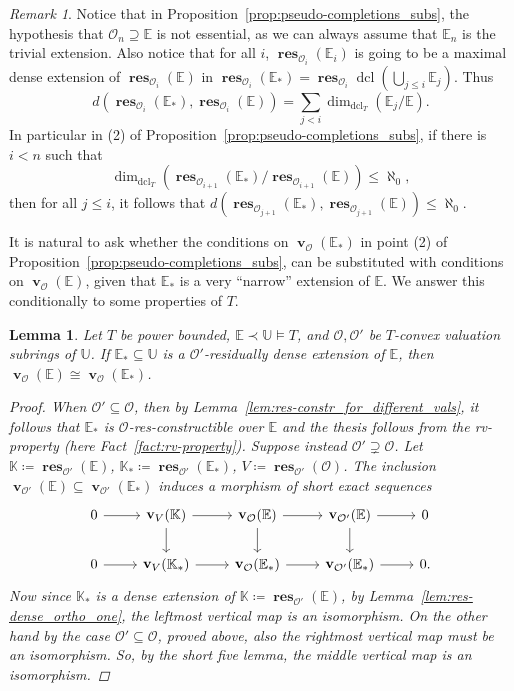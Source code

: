 \documentclass{amsart}
\newtheorem{lemma}[theorem]{Lemma}
\theoremstyle{remark}
\newtheorem{remark}[theorem]{Remark}
\theoremstyle{definition}
\theoremstyle{plain}
\newcommand{\bE}{\mathbb E}
\newcommand{\bK}{\mathbb K}
\newcommand{\bU}{\mathbb U}
\newcommand{\cO}{\mathcal O}
\DeclareMathOperator{\val}{\mathbf{v}}
\DeclareMathOperator{\res}{\mathbf{res}}
\DeclareMathOperator{\dcl}{\mathrm{dcl}}
\theoremstyle{plain}
\begin{document}
\begin{remark}
    Notice that in Proposition~\ref{prop:pseudo-completions_subs}, the hypothesis that $\cO_n\supseteq \bE$ is not essential, as we can always assume that $\bE_n$ is the trivial extension. 
    Also notice that for all $i$, $\res_{\cO_i}(\bE_i)$ is going to be a maximal dense extension of $\res_{\cO_i}(\bE)$ in $\res_{\cO_i}(\bE_*)=\res_{\cO_i}\dcl(\bigcup_{j\le i} \bE_j)$. Thus \[d(\res_{\cO_i}(\bE_*), \res_{\cO_i}(\bE))=\sum_{j<i}\dim_{\dcl_T}(\bE_j/\bE).\]
    In particular in (2) of Proposition~\ref{prop:pseudo-completions_subs}, if there is $i<n$ such that 
    \[\dim_{\dcl_T}(\res_{\cO_{i+1}}(\bE_*)/ \res_{\cO_{i+1}}(\bE))\le \aleph_0,\]
    then for all $j\le i$, it follows that $d(\res_{\cO_{j+1}}(\bE_*), \res_{\cO_{j+1}}(\bE) )\le \aleph_0$.

\end{remark}

It is natural to ask whether the conditions on $\val_{\cO}(\bE_*)$ in point (2) of Proposition~\ref{prop:pseudo-completions_subs}, can be substituted with conditions on $\val_{\cO}(\bE)$, given that $\bE_*$ is a very ``narrow'' extension of $\bE$. We answer this conditionally to some properties of $T$.

\begin{lemma}\label{lem:pbdd_res_dense_ext_vg}
    Let $T$ be power bounded, $\bE\prec \bU \models T$, and $\cO, \cO'$ be $T$-convex valuation subrings of $\bU$. If $\bE_*\subseteq \bU$ is a $\cO'$-residually dense extension of $\bE$, then $\val_\cO(\bE)\cong\val_{\cO}(\bE_*)$.
    \begin{proof}
        When $\cO'\subseteq \cO$, then by Lemma~\ref{lem:res-constr_for_different_vals}, it follows that $\bE_*$ is $\cO$-res-constructible over $\bE$ and the thesis follows from the rv-property (here Fact~\ref{fact:rv-property}).
        Suppose instead $\cO' \supsetneq \cO$.
        Let $\bK \coloneqq  \res_{\cO'}(\bE)$, $\bK_*\coloneqq \res_{\cO'}(\bE_*)$, $V\coloneqq \res_{\cO'}(\cO)$.
        The inclusion $\val_{\cO'}(\bE) \subseteq \val_{\cO'}(\bE_*)$ induces a morphism of short exact sequences
        \[\begin{tikzcd}
            0 \ar[r] &\val_V(\bK)\ar[d] \ar[r] &\val_{\cO}(\bE) \ar[r]\ar[d]& \val_{\cO'}(\bE) \ar[r]\ar[d] &0\\
            0 \ar[r] &\val_V(\bK_*) \ar[r] &\val_{\cO}(\bE_*) \ar[r]& \val_{\cO'}(\bE_*) \ar[r] &0.
        \end{tikzcd}\]
        Now since $\bK_*$ is a dense extension of $\bK\coloneqq \res_{\cO'}(\bE)$, by Lemma~\ref{lem:res-dense_ortho_one}, the leftmost vertical map is an isomorphism. On the other hand by the case $\cO' \subseteq \cO$, proved above, also the rightmost vertical map must be an isomorphism. So, by the short five lemma, the middle vertical map is an isomorphism.   
    \end{proof}
\end{lemma}
\end{document}

